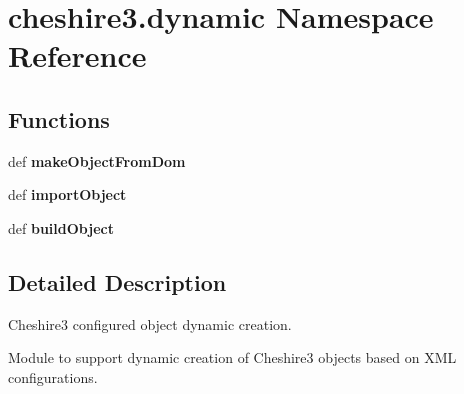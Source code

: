 \hypertarget{namespacecheshire3_1_1dynamic}{\section{cheshire3.\-dynamic Namespace Reference}
\label{namespacecheshire3_1_1dynamic}
}
\subsection*{Functions}
\begin{DoxyCompactItemize}
\item 
\hypertarget{namespacecheshire3_1_1dynamic_a6aeeb03573dbec2ea52d1fafff96e730}{def {\bfseries make\-Object\-From\-Dom}}\label{namespacecheshire3_1_1dynamic_a6aeeb03573dbec2ea52d1fafff96e730}

\item 
\hypertarget{namespacecheshire3_1_1dynamic_a865301d87000760537a5b768e5b9b904}{def {\bfseries import\-Object}}\label{namespacecheshire3_1_1dynamic_a865301d87000760537a5b768e5b9b904}

\item 
\hypertarget{namespacecheshire3_1_1dynamic_a1e972121f84bd0114a8339b0254aa6ed}{def {\bfseries build\-Object}}\label{namespacecheshire3_1_1dynamic_a1e972121f84bd0114a8339b0254aa6ed}

\end{DoxyCompactItemize}


\subsection{Detailed Description}
\begin{DoxyVerb}Cheshire3 configured object dynamic creation.

Module to support dynamic creation of Cheshire3 objects based on XML
configurations.
\end{DoxyVerb}
 